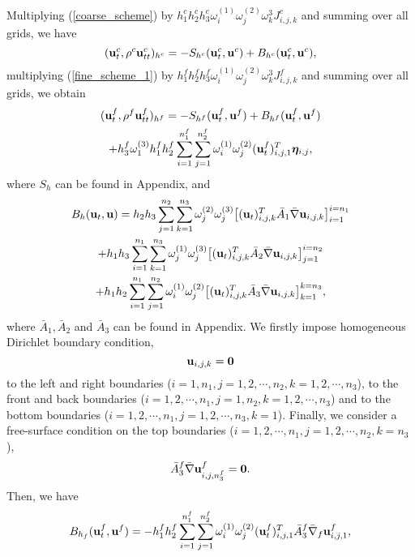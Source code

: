 \documentclass[a4paper]{article}
\begin{document}
Multiplying (\ref{coarse_scheme}) by $h_1^ch_2^ch_3^c\omega_i^{(1)}\omega_j^{(2)}\omega_k^{3}J_{i,j,k}^c$ and summing over all grids, we have
\begin{equation}\label{coarse_simple}
({\bf u}_t^c, \rho^c{\bf u}_{tt}^c)_{h^c} = -S_{h^c}({\bf u}_t^c,{\bf u}^c) + B_{h^c}({\bf u}_t^c,{\bf u}^c),
\end{equation}
multiplying (\ref{fine_scheme_1}) by $h_1^fh_2^fh_3^f\omega_i^{(1)}\omega_j^{(2)}\omega_k^{3}J_{i,j,k}^f$ and summing over all grids, we obtain
\begin{multline}\label{fine_simple}
({\bf u}_t^f, \rho^f{\bf u}_{tt}^f)_{h^f} = -S_{h^f}({\bf u}_t^f,{\bf u}^f) + B_{h^f}({\bf u}_t^f,{\bf u}^f) \\
+h_3^f\omega_1^{(3)}h_1^fh_2^f\sum_{i=1}^{n_1^f}\sum_{j=1}^{n_2^f}\omega_i^{(1)}\omega_j^{(2)}({\bf u}_t^f)_{i,j,1}^{T}{\bm \eta}_{i,j},
\end{multline}
where  $S_h$ can be found in Appendix, and 
\begin{multline*}
B_h({\bf u}_t, {\bf u}) = h_2h_3\sum_{j=1}^{n_2}\sum_{k=1}^{n_3}\omega_j^{(2)}\omega_j^{(3)}\big[({\bf u}_t)_{i,j,k}^{T}\bar{A}_1\bar{\nabla}{\bf u}_{i,j,k}\big]_{i=1}^{i=n_1}\\
+h_1h_3\sum_{i=1}^{n_1}\sum_{k=1}^{n_3}\omega_j^{(1)}\omega_j^{(3)}\big[({\bf u}_t)_{i,j,k}^{T}\bar{A}_2\bar{\nabla}{\bf u}_{i,j,k}\big]_{j=1}^{i=n_2}\\
+h_1h_2\sum_{i=1}^{n_1}\sum_{j=1}^{n_2}\omega_i^{(1)}\omega_j^{(2)}\big[({\bf u}_t)_{i,j,k}^{T}\bar{A}_3\bar{\nabla}{\bf u}_{i,j,k}\big]_{k=1}^{k=n_3},
\end{multline*}
where $\bar{A}_1, \bar{A}_2$ and $\bar{A}_3$ can be found in Appendix.  We firstly impose homogeneous Dirichlet boundary condition,
\begin{equation*}
{\bf u}_{i,j,k} = {\bf 0}
\end{equation*}
to the left and right boundaries ($i = 1,n_1, j = 1,2,\cdots,n_2,k = 1,2,\cdots,n_3$), to the front and back boundaries ($i = 1,2,\cdots,n_1, j = 1,n_2,k = 1,2,\cdots,n_3$) and to the bottom boundaries ($i = 1,2,\cdots,n_1, j = 1,2,\cdots,n_3, k = 1$). Finally, we consider a free-surface condition on the top boundaries ($i = 1,2,\cdots,n_1, j = 1,2,\cdots,n_2, k = n_3$),
\begin{equation*}
\bar{A}_3^f\bar{\nabla} {\bf u}_{i,j,n_3^f}^f = {\bf 0}.
\end{equation*}
Then, we have
\begin{equation}\label{boundary_f}
B_{h_f} ({\bf u}_t^f,{\bf u}^f) = -h_1^fh_2^f\sum_{i = 1}^{n_1^f}\sum_{j=1}^{n_2^f}\omega_i^{(1)}\omega_j^{(2)}({\bf u}_t^f)^T_{i,j,1}\bar{A}_3^f\bar{\nabla}_f{\bf u}^f_{i,j,1},
\end{equation}
\end{document}

